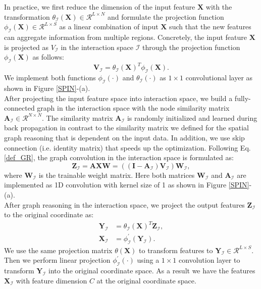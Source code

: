 \documentclass[letterpaper, 10 pt, conference]{ieeeconf}
\begin{document}
In practice, we first reduce the dimension of the input feature $\boldsymbol{X}$ with the transformation $\theta_{\mathcal{I}}(\boldsymbol{X}) \in \mathcal{R}^{L \times N}$ and formulate the projection function $\phi_{\mathcal{I}}(\boldsymbol{X}) \in \mathcal{R}^{L \times S}$ as a linear combination of input $\boldsymbol{X}$ such that the new features can aggregate information from multiple regions. Concretely, the input feature $\boldsymbol{X}$ is projected as $V_{\mathcal{I}}$ in the interaction space $\mathcal{I}$ through the projection function $\phi_{\mathcal{I}}(\boldsymbol{X})$ as follows:
\begin{equation}
	\boldsymbol{V}_{\mathcal{I}} = \theta_{\mathcal{I}}(\boldsymbol{X})^T \phi_{\mathcal{I}}(\boldsymbol{X}).
\end{equation}
We implement both functions  $\phi_{\mathcal{I}}(\cdot)$ and $\theta_{\mathcal{I}}(\cdot)$ as $1 \times 1$ convolutional layer as shown in Figure \ref{SPIN}-(a).\\
 After projecting the input feature space into interaction space, we build a fully-connected graph in the interaction space with the node similarity matrix $\boldsymbol{A}_{\mathcal{I}} \in \mathcal{R}^{N \times N}$. The similarity matrix $\boldsymbol{A}_{\mathcal{I}}$ is randomly  initialized and learned during back propagation in contrast to the similarity matrix we defined for the spatial graph reasoning that is dependent on the input data. In addition, we use skip connection (i.e. identity matrix) that speeds up the optimization. Following Eq. \eqref{def_GR}, the graph convolution in the interaction space is formulated as:
\begin{equation}
	\boldsymbol{Z}_{\mathcal{I}} = \boldsymbol{A} \boldsymbol{X} \boldsymbol{W} = ((\boldsymbol{I}-\boldsymbol{A}_{\mathcal{I}}) \boldsymbol{V}_{\mathcal{I}})\boldsymbol{W}_{\mathcal{I}},
\end{equation}
where $\boldsymbol{W}_{\mathcal{I}}$ is the trainable weight matrix. Here both matrices  $\boldsymbol{W}_{\mathcal{I}}$ and $\boldsymbol{A}_{\mathcal{I}}$ are implemented as 1D convolution with kernel size of 1 as shown in Figure \ref{SPIN}-(a).\\
 After graph reasoning in the interaction space, we project the output features $\boldsymbol{Z}_{\mathcal{I}}$ to the original coordinate as:
\begin{align}
	\boldsymbol{Y}_{\mathcal{I}} &= \theta_{\mathcal{I}}(\boldsymbol{X})^T\boldsymbol{Z}_{\mathcal{I}},\\
	\boldsymbol{X}_{\mathcal{I}} &= \phi^{'}_{\mathcal{I}}(\boldsymbol{Y}_{\mathcal{I}}).
\end{align}
 We use the same projection matrix $\theta(\boldsymbol{X})$ to transform features to $\boldsymbol{Y}_{\mathcal{I}} \in \mathcal{R}^{L \times S}$. Then we perform linear projection $\phi^{'}_{\mathcal{I}}(\cdot)$ using a $1 \times 1$ convolution layer to transform $\boldsymbol{Y}_{\mathcal{I}}$ into the original coordinate space. As a result we have the features $\boldsymbol{X}_{\mathcal{I}}$ with feature dimension $C$ at the original coordinate space. 
 
\end{document}
